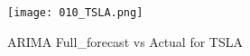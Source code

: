 \documentclass{article}
\begin{document}
\begin{figure}[h]
\centering
\texttt{[image: 010\_TSLA.png]}
\caption{ARIMA Full_forecast vs Actual for TSLA}
\label{fig:TSLA_full_forecast}
\end{figure}
\end{document}

